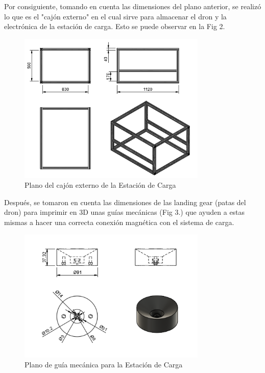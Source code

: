  Por consiguiente, tomando en cuenta las dimensiones del plano anterior, se realizó lo que es el "cajón externo" en el cual sirve para almacenar el dron y la electrónica de la estación de carga. Esto se puede observar en la Fig 2.
        \begin{figure}[htpb]
            \centering
            \includegraphics[width=0.8\textwidth]{PLANOS/PLANOS_CAJON_EXTERNO_1.png}
            \caption{Plano del cajón externo de la Estación de Carga}
            \label{fig:etiqueta}
        \end{figure}

Después, se tomaron en cuenta las dimensiones de las landing gear (patas del dron) para imprimir en 3D unas guías mecánicas (Fig 3.) que ayuden a estas mismas a hacer una correcta conexión magnética con el sistema de carga.
        \begin{figure}[htpb]
            \centering
            \includegraphics[width=0.8\textwidth]{PLANOS/PLANO_GUIAS_MECANICAS.png}
            \caption{Plano de guía mecánica para la Estación de Carga}
            \label{fig:etiqueta}
        \end{figure}

